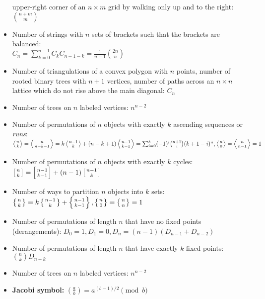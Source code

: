 \documentclass[9pt,a4paper,twocolumn,landscape,oneside]{amsart}
\begin{document}
\begin{itemize}[leftmargin=*]
                upper-right corner of an $n\times m$ grid by walking only up
                and to the right: $\binom{n+m}{m}$
            \fi
            \item Number of strings with $n$ sets of brackets such that the
                brackets are balanced: \\ $C_n = \sum_{k=0}^{n-1} C_kC_{n-1-k}
                = \frac{1}{n+1}\binom{2n}n$
            \item Number of triangulations of a convex polygon with $n$ points,
                number of rooted binary trees with $n+1$ vertices, number of
                paths across an $n\times n$ lattice which do not rise above the
                main diagonal: $C_n$
            \item Number of trees on $n$ labeled vertices: $n^{n-2}$
            \item Number of permutations of $n$ objects with exactly $k$
                ascending sequences or {\it runs}: \\ $\left\langle {n \atop k}
                \right\rangle = \left\langle {n \atop n - k - 1} \right\rangle
                = k\left\langle {n - 1 \atop k} \right\rangle + (n - k +
                1)\left\langle {n-1 \atop k-1} \right\rangle =
                \sum_{i=0}^{k}(-1)^i \binom{n+1}{i} (k+1-i)^n, \left\langle {n
                \atop 0} \right\rangle = \left\langle {n \atop n -1}
                \right\rangle = 1$
            \item Number of permutations of $n$ objects with exactly $k$
                cycles: $\left[n \atop k\right] = \left[n-1 \atop k-1\right] +
                (n-1)\left[n-1 \atop k\right]$
            \item Number of ways to partition $n$ objects into $k$ sets:
                $\left\{n \atop k\right\} = k\left\{n-1 \atop k\right\} +
                \left\{n-1 \atop k-1\right\}, \left\{n\atop 0\right\} =
                \left\{n\atop n\right\} = 1$
            \item Number of permutations of length $n$ that have no fixed
                points (derangements): $D_0 = 1, D_1 = 0, D_n = (n - 1)(D_{n-1}
                + D_{n-2})$
            \item Number of permutations of length $n$ that have exactly $k$
                fixed points: $\binom{n}{k} D_{n-k}$
            \item Number of trees on $n$ labeled vertices: $n^{n-2}$
            \item \textbf{Jacobi symbol:} $\left(\frac{a}{b}\right) = a^{(b-1)/2} \pmod{b}$

\end{itemize}
\end{document}
